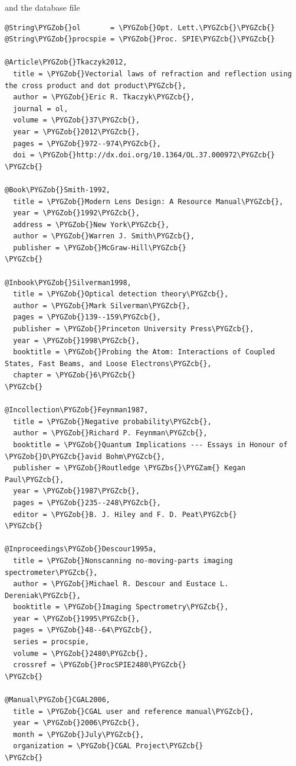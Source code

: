 \documentclass[letterpaper,10pt,english]{sphinxmanual}
\def\PYGZbs{\char`\\}
\def\PYGZob{\char`\{}
\def\PYGZcb{\char`\}}
\def\PYGZam{\char`\&}
\begin{document}
and the database file

\begin{Verbatim}[commandchars=\\\{\}]
@String\PYGZob{}ol       = \PYGZob{}Opt. Lett.\PYGZcb{}\PYGZcb{}
@String\PYGZob{}procspie = \PYGZob{}Proc. SPIE\PYGZcb{}\PYGZcb{}

@Article\PYGZob{}Tkaczyk2012,
  title = \PYGZob{}Vectorial laws of refraction and reflection using the cross product and dot product\PYGZcb{},
  author = \PYGZob{}Eric R. Tkaczyk\PYGZcb{},
  journal = ol,
  volume = \PYGZob{}37\PYGZcb{},
  year = \PYGZob{}2012\PYGZcb{},
  pages = \PYGZob{}972--974\PYGZcb{},
  doi = \PYGZob{}http://dx.doi.org/10.1364/OL.37.000972\PYGZcb{}
\PYGZcb{}

@Book\PYGZob{}Smith-1992,
  title = \PYGZob{}Modern Lens Design: A Resource Manual\PYGZcb{},
  year = \PYGZob{}1992\PYGZcb{},
  address = \PYGZob{}New York\PYGZcb{},
  author = \PYGZob{}Warren J. Smith\PYGZcb{},
  publisher = \PYGZob{}McGraw-Hill\PYGZcb{}
\PYGZcb{}

@Inbook\PYGZob{}Silverman1998,
  title = \PYGZob{}Optical detection theory\PYGZcb{},
  author = \PYGZob{}Mark Silverman\PYGZcb{},
  pages = \PYGZob{}139--159\PYGZcb{},
  publisher = \PYGZob{}Princeton University Press\PYGZcb{},
  year = \PYGZob{}1998\PYGZcb{},
  booktitle = \PYGZob{}Probing the Atom: Interactions of Coupled States, Fast Beams, and Loose Electrons\PYGZcb{},
  chapter = \PYGZob{}6\PYGZcb{}
\PYGZcb{}

@Incollection\PYGZob{}Feynman1987,
  title = \PYGZob{}Negative probability\PYGZcb{},
  author = \PYGZob{}Richard P. Feynman\PYGZcb{},
  booktitle = \PYGZob{}Quantum Implications --- Essays in Honour of \PYGZob{}D\PYGZcb{}avid Bohm\PYGZcb{},
  publisher = \PYGZob{}Routledge \PYGZbs{}\PYGZam{} Kegan Paul\PYGZcb{},
  year = \PYGZob{}1987\PYGZcb{},
  pages = \PYGZob{}235--248\PYGZcb{},
  editor = \PYGZob{}B. J. Hiley and F. D. Peat\PYGZcb{}
\PYGZcb{}

@Inproceedings\PYGZob{}Descour1995a,
  title = \PYGZob{}Nonscanning no-moving-parts imaging spectrometer\PYGZcb{},
  author = \PYGZob{}Michael R. Descour and Eustace L. Dereniak\PYGZcb{},
  booktitle = \PYGZob{}Imaging Spectrometry\PYGZcb{},
  year = \PYGZob{}1995\PYGZcb{},
  pages = \PYGZob{}48--64\PYGZcb{},
  series = procspie,
  volume = \PYGZob{}2480\PYGZcb{},
  crossref = \PYGZob{}ProcSPIE2480\PYGZcb{}
\PYGZcb{}

@Manual\PYGZob{}CGAL2006,
  title = \PYGZob{}CGAL user and reference manual\PYGZcb{},
  year = \PYGZob{}2006\PYGZcb{},
  month = \PYGZob{}July\PYGZcb{},
  organization = \PYGZob{}CGAL Project\PYGZcb{}
\PYGZcb{}


\end{Verbatim}
\end{document}
